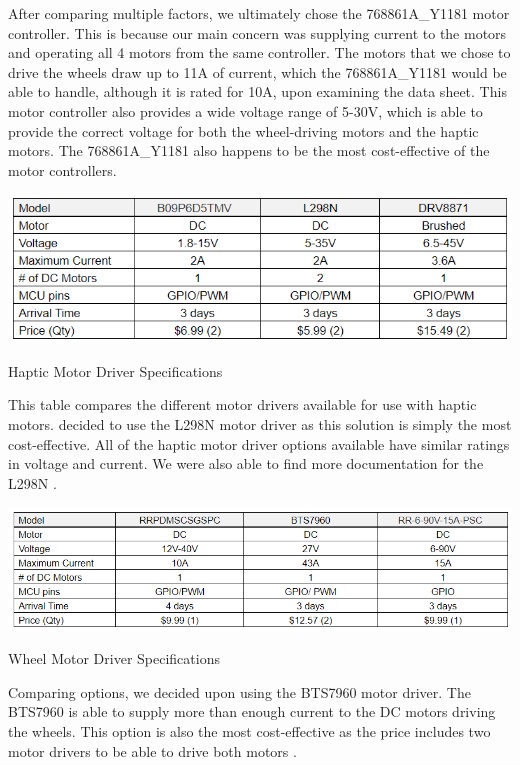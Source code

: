 \noindent After comparing multiple factors, we ultimately chose the 768861A\_Y1181 motor controller. This is because our main concern was supplying current to the motors and operating all 4 motors from the same controller. The motors that we chose to drive the wheels draw up to 11A of current, which the 768861A\_Y1181 would be able to handle, although it is rated for 10A, upon examining the data sheet. This motor controller also provides a wide voltage range of 5-30V, which is able to provide the correct voltage for both the wheel-driving motors and the haptic motors. The 768861A\_Y1181 also happens to be the most cost-effective of the motor controllers. \cite{UMLIFE} \cite{AliExpress5} \cite{Makerbase} \cite{AliExpress7} \cite{CircuitBasics} \cite{Espressif1} \cite{AliExpress4} \cite{Burgess} \cite{RandomNerd} \cite{Espressif2} \cite{SimpleFOC} \cite{SimpleFOC2} \cite{Peza}\\


\begin{table}[H]
	\centering
	\includegraphics[width=1\textwidth]{./Images/haptic_driver_table_2.png}
	\caption{\label{fig:haptic_driver}Haptic Motor Driver Specifications}
\end{table}

\noindent This table compares the different motor drivers available for use with haptic motors.  decided to use the L298N motor driver as this solution is simply the most cost-effective. All of the haptic motor driver options available have similar ratings in voltage and current. We were also able to find more documentation for the L298N \cite{BOJACK} \cite{BEEYDC} \cite{HiLetgo}.\\

\begin{table}[H]
	\centering
	\includegraphics[width=1\textwidth]{./Images/wheel_driver_table.png}
	\caption{\label{fig:wheel_driver}Wheel Motor Driver Specifications}
\end{table}

\noindent Comparing options, we decided upon using the BTS7960 motor driver. The BTS7960 is able to supply more than enough current to the DC motors driving the wheels. This option is also the most cost-effective as the price includes two motor drivers to be able to drive both motors \cite{RioRand} \cite{Gikfun} \cite{Hobbywing}.\\ 
